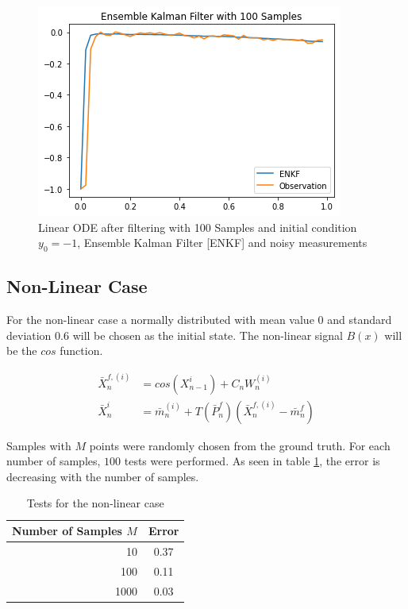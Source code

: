 \documentclass{article}
\begin{document}
\begin{figure}[!ht]
\centering
    \includegraphics{M100_negative.png}
    \caption{Linear ODE after filtering with 100 Samples and initial condition $y_0=-1$, Ensemble Kalman Filter [ENKF] and noisy measurements}
    \label{fig:DGL_EF4}
\end{figure}

\subsection{Non-Linear Case}



For the non-linear case a normally distributed with mean value $0$ and standard deviation $0.6$ will be chosen as the initial state. The non-linear signal $B(x)$ will be the $cos$ function.

\begin{align}
    \bar{X}_n^{f,(i)}&= cos \left( {X}_{n-1}^{i} \right) + C_n W_n^{(i)}\\
    \bar{X}_n^{i}&= \bar{m}_n^{(i)} + T(\bar{P}_n^f) \left(\bar{X}_n^{f,(i)}-\bar{m}_n^{f} \right)
\end{align}

Samples with $M$ points were randomly chosen from the ground truth. For each number of samples, $100$ tests were performed. As seen in table \ref{tab:error}, the error is decreasing with the number of samples. 

\begin{table}[!h]
\begin{center}
\begin{tabular}{ r | c  }
  Number of Samples $M$ & Error  \\
	\hline
  10 & 0.37  \\
  100 & 0.11  \\
	1000 & 0.03
\end{tabular}
\caption{Tests for the non-linear case}
\label{tab:error}
\end{center}
\end{table}
\end{document}
